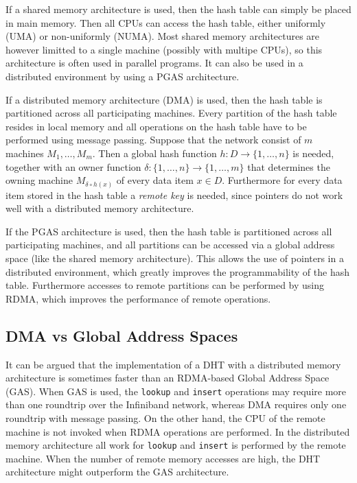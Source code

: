 If a shared memory architecture is used, then the hash table can simply be placed in main memory. Then all CPUs can access the hash table, either uniformly (UMA) or non-uniformly (NUMA). Most shared memory architectures are however limitted to a single machine (possibly with multipe CPUs), so this architecture is often used in parallel programs. It can also be used in a distributed environment by using a PGAS architecture. 

If a distributed memory architecture (DMA) is used, then the hash table is partitioned across all participating machines. Every partition of the hash table resides in local memory and all operations on the hash table have to be performed using message passing. Suppose that the network consist of $m$ machines $M_1, \dots, M_m$. Then a global hash function $h : D \rightarrow \{ 1, \dots, n \}$ is needed, together with an owner function $\delta : \{ 1, \dots, n \} \rightarrow \{ 1, \dots, m \}$ that determines the owning machine $M_{\delta \circ h(x)}$ of every data item $x \in D$. Furthermore for every data item stored in the hash table a \emph{remote key} is needed, since pointers do not work well with a distributed memory architecture.

If the PGAS architecture is used, then the hash table is partitioned across all participating machines, and all partitions can be accessed via a global address space (like the shared memory architecture). This allows the use of pointers in a distributed environment, which greatly improves the programmability of the hash table. Furthermore accesses to remote partitions can be performed by using RDMA, which improves the performance of remote operations. 

\subsection{DMA vs Global Address Spaces}
It can be argued that the implementation of a DHT with a distributed memory architecture is sometimes faster than an RDMA-based Global Address Space (GAS). When GAS is used, the \texttt{lookup} and \texttt{insert} operations may require more than one roundtrip over the Infiniband network, whereas DMA requires only one roundtrip with message passing. On the other hand, the CPU of the remote machine is not invoked when RDMA operations are performed. In the distributed memory architecture all work for \texttt{lookup} and \texttt{insert} is performed by the remote machine. When the number of remote memory accesses are high, the DHT architecture might outperform the GAS architecture.

